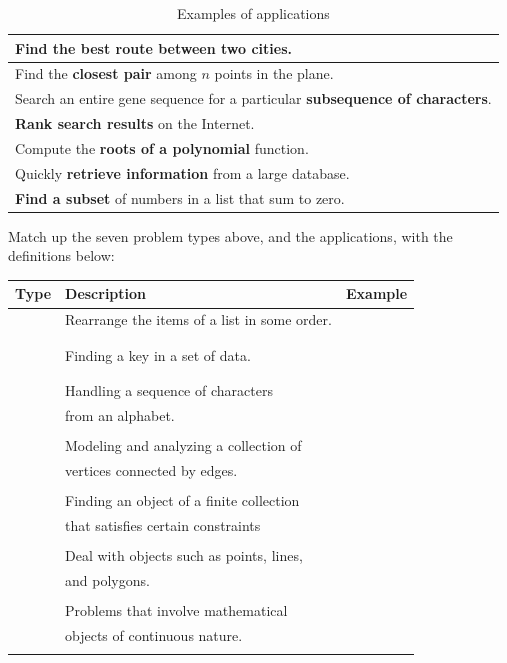 \documentclass[12pt]{article}
\begin{document}
\begin{table}[h]
    \caption{Examples of applications}
    \begin{tabular}{|l|}
        \hline
        Find the \textbf{best route} between two cities.\\\hline
        Find the \textbf{closest pair} among $n$ points in the plane. \\\hline
        Search an entire gene sequence for a particular \textbf{subsequence of characters}. \\\hline
        \textbf{Rank search results} on the Internet. \\\hline
        Compute the \textbf{roots of a polynomial} function. \\\hline
        Quickly \textbf{retrieve information} from a large database. \\\hline
        \textbf{Find a subset} of numbers in a list that sum to zero. \\\hline
    \end{tabular}
\end{table}

Match up the seven problem types above, and the applications, with the definitions below:\\

    \begin{tabular}{|c|l|c|}
        \hline
        Type & Description & Example \\\hline
        \hspace{1.25in} & Rearrange the items of a list in some order. & \hspace{1.5in} \\& & \\
        & & \\\hline
        & Finding a key in a set of data. & \\& & \\
        & & \\\hline
        & Handling a sequence of characters & \\
        & from an alphabet. &\\& & \\\hline
        & Modeling and analyzing a collection of  & \\
        & vertices connected by edges. &  \\& & \\\hline
        & Finding an object of a finite collection & \\
        & that satisfies certain constraints & \\& & \\\hline
        & Deal with objects such as points, lines, & \\
        & and polygons. & \\& & \\\hline
        & Problems that involve mathematical & \\
        & objects of continuous nature. & \\& & \\\hline
    \end{tabular}
\end{document}
